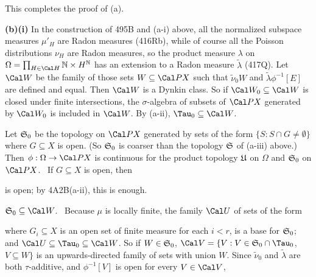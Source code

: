 {This completes the proof of (a).

\medskip

{\bf (b)(i)} In the construction of 495B and (a-i) above, all the
normalized subspace measures $\mu'_H$ are Radon measures (416Rb), while of
course all the Poisson distributions $\nu_H$ are Radon measures, so the
product measure $\lambda$ on
$\Omega=\prod_{H\in\Cal H}\Bbb N\times H^{\Bbb N}$ has an extension to a
Radon measure $\tilde\lambda$ (417Q).
Let $\Cal W$ be the family of those sets $W\subseteq\Cal PX$
such that $\tilde\nu_0W$ and $\tilde\lambda\phi^{-1}[E]$ are defined and
equal.   Then $\Cal W$ is a Dynkin class.   So if
$\Cal W_0\subseteq\Cal W$ is closed under finite intersections,
the $\sigma$-algebra of subsets of $\Cal PX$ generated by $\Cal W_0$ is
included in $\Cal W$.   By (a-ii), $\Tau_0\subseteq\Cal W$.

\medskip

 Let $\frak S_0$ be the topology on $\Cal PX$ generated by
sets of the form $\{S:S\cap G\ne\emptyset\}$ where $G\subseteq X$ is open.
(So $\frak S_0$ is coarser than the topology $\frak S$ of (a-iii) above.)
Then $\phi:\Omega\to\Cal PX$ is continuous for the product topology
$\frak U$ on $\Omega$ and $\frak S_0$ on $\Cal PX$.   \Prf\ If
$G\subseteq X$ is open, then


\noindent is open;  by 4A2B(a-ii), this is enough.\ \Qed

\medskip

 $\frak S_0\subseteq\Cal W$.   \Prf\ Because $\mu$ is
locally finite, the family $\Cal U$ of sets of the form


\noindent where $G_i\subseteq X$ is an open set of finite measure for each
$i<r$, is a base for $\frak S_0$;  and
$\Cal U\subseteq\Tau_0\subseteq\Cal W$.   So if $W\in\frak S_0$,
$\Cal V=\{V:V\in\frak S_0\cap\Tau_0$, $V\subseteq W\}$ is an
upwards-directed family of sets with union $W$.   Since $\tilde\nu_0$ and
$\tilde\lambda$ are both $\tau$-additive, and $\phi^{-1}[V]$ is open for
every $V\in\Cal V$,


}
